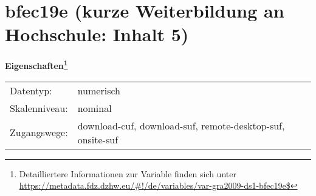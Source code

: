 
    \setcounter{footnote}{0}

    \vspace*{-1.8cm}
	\section{bfec19e (kurze Weiterbildung an Hochschule: Inhalt 5)}
	\label{section:bfec19e}



    \vspace*{0.5cm}
    \noindent\textbf{Eigenschaften\footnote{Detailliertere Informationen zur Variable finden sich unter
		\url{https://metadata.fdz.dzhw.eu/\#!/de/variables/var-gra2009-ds1-bfec19e$}}}\\
	\begin{tabularx}{\hsize}{@{}lX}
	Datentyp: & numerisch \\
	Skalenniveau: & nominal \\
	Zugangswege: &
	  download-cuf, 
	  download-suf, 
	  remote-desktop-suf, 
	  onsite-suf
 \\
    \end{tabularx}



